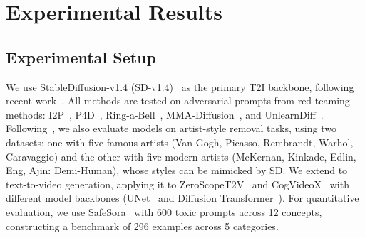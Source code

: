 \section{Experimental Results}
\subsection{Experimental Setup}
We use StableDiffusion-v1.4 (SD-v1.4)~\citep{rombach2022high} as the primary T2I backbone, following recent work~\citep{gandikota2023erasing,gandikota2024unified,gong2024reliable}. All methods are tested on adversarial prompts from red-teaming methods: I2P~\citep{schramowski2023safe}, P4D~\citep{chin2024prompting4debugging}, Ring-a-Bell~\citep{tsai2024ring}, MMA-Diffusion~\citep{yang2024mma}, and UnlearnDiff~\citep{zhang2023generate}. Following~\cite{gandikota2023erasing}, we also evaluate models on artist-style removal tasks, using two datasets: one with five famous artists (Van Gogh, Picasso, Rembrandt, Warhol, Caravaggio) and the other with five modern artists (McKernan, Kinkade, Edlin, Eng, Ajin: Demi-Human), whose styles can be mimicked by SD. We extend \ours{} to text-to-video generation, applying it to ZeroScopeT2V~\citep{2023zeroscope} and CogVideoX~\citep{yang2024cogvideox} with different model backbones (UNet~\citep{ronneberger2015u} and Diffusion Transformer~\citep{peebles2023scalable}). For quantitative evaluation, we use SafeSora~\citep{dai2024safesora} with 600 toxic prompts across 12 concepts, constructing a benchmark of 296 examples across 5 categories. 










